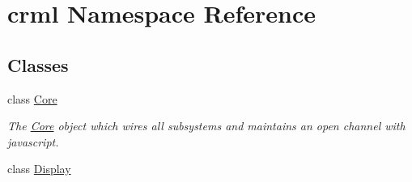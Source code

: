 \hypertarget{namespacecrml}{
\section{crml Namespace Reference}
\label{namespacecrml}
}
\subsection*{Classes}
\begin{DoxyCompactItemize}
\item 
class \hyperlink{classcrml_1_1_core}{Core}
\begin{DoxyCompactList}\small\item\em The \hyperlink{classcrml_1_1_core}{Core} object which wires all subsystems and maintains an open channel with javascript. \item\end{DoxyCompactList}\item 
class \hyperlink{classcrml_1_1_display}{Display}
\end{DoxyCompactItemize}
